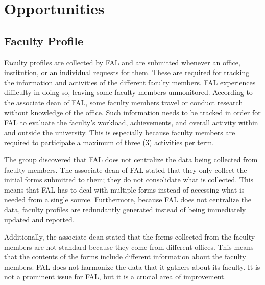 \section{Opportunities}


\subsection{Faculty Profile}
Faculty profiles are collected by FAL and are submitted whenever an office, institution, or an individual requests for them. These are required for tracking the information and activities of the different faculty members. FAL experiences difficulty in doing so, leaving some faculty members unmonitored. According to the associate dean of FAL, some faculty members travel or conduct research without knowledge of the office. Such information needs to be tracked in order for FAL to evaluate the faculty’s workload, achievements, and overall activity within and outside the university. This is especially because faculty members are required to participate a maximum of three (3) activities per term.

The group discovered that FAL does not centralize the data being collected from faculty members. The associate dean of FAL stated that they only collect the initial forms submitted to them; they do not consolidate what is collected. This means that FAL has to deal with multiple forms instead of accessing what is needed from a single source. Furthermore, because FAL does not centralize the data, faculty profiles are redundantly generated instead of being immediately updated and reported.

Additionally, the associate dean stated that the forms collected from the faculty members are not standard because they come from different offices. This means that the contents of the forms include different information about the faculty members. FAL does not harmonize the data that it gathers about its faculty. It is not a prominent issue for FAL, but it is a crucial area of improvement.
